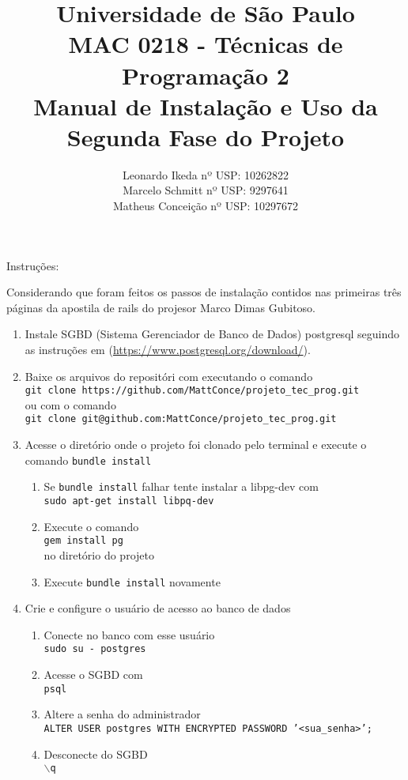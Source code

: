 \documentclass[12pt,a4paper]{article}
\title{{\bf Universidade de São Paulo} \\MAC 0218 - Técnicas de Programação 2 \\ Manual de Instalação e Uso da Segunda Fase do Projeto}
\author{Leonardo Ikeda     nº USP: 10262822 \\
	    Marcelo Schmitt    nº USP: 9297641\\
	    Matheus Conceição  nº USP: 10297672}
\begin{document}
\date{}
\maketitle

Instruções:

Considerando que foram feitos os passos de instalação contidos nas primeiras três páginas da apostila de rails do projesor Marco Dimas Gubitoso.

\begin{enumerate}
	\item Instale SGBD (Sistema Gerenciador de Banco de Dados) postgresql seguindo as instruções em (\url{https://www.postgresql.org/download/}).
	\item Baixe os arquivos do repositóri com executando o comando\\ \texttt{git clone https://github.com/MattConce/projeto\_tec\_prog.git}\\ ou com o comando\\ \texttt{git clone git@github.com:MattConce/projeto\_tec\_prog.git}
	\item Acesse o diretório onde o projeto foi clonado pelo terminal e execute o comando \texttt{bundle install}
	\begin{enumerate}
		\item Se \texttt{bundle install} falhar tente instalar a libpg-dev com \\ \texttt{sudo apt-get install libpq-dev}
		\item Execute o comando \\
		\texttt{gem install pg} \\
		no diretório do projeto
		\item Execute \texttt{bundle install} novamente
	\end{enumerate}
	\item Crie e configure o usuário de acesso ao banco de dados
	\begin{enumerate}
		\item Conecte no banco com esse usuário\\
		\texttt{sudo su - postgres}
		\item Acesse o SGBD com\\
		\texttt{psql}
		\item Altere a senha do administrador\\
		\texttt{ALTER USER postgres WITH ENCRYPTED PASSWORD '<sua\_senha>';}
		\item Desconecte do SGBD\\
		\texttt{$\backslash$q}

\end{enumerate}
\end{enumerate}
\end{document}
